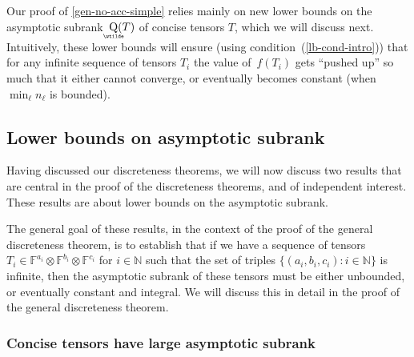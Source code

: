 \documentclass{daj}
\DeclareMathOperator{\asympsubrank}{\underaccent{\wtilde}{Q}}
\newcommand{\FF}{\mathbb{F}}
\newcommand{\NN}{\mathbb{N}}
\begin{document}
Our proof of \autoref{gen-no-acc-simple} relies mainly on new lower bounds on the asymptotic subrank~$\asympsubrank(T)$ of concise tensors $T$, which we will discuss next. Intuitively, these lower bounds will ensure (using condition~(\ref{lb-cond-intro})) that for any infinite sequence of tensors $T_i$ the value of~$f(T_i)$ gets ``pushed up'' so much that it either cannot converge, or eventually becomes constant (when $\min_\ell n_\ell$ is bounded).

%
%
%
%
%
%
%
%
%
%
%
%

\subsection{Lower bounds on asymptotic subrank}

Having discussed our discreteness theorems, we will now discuss two results that are central in the proof of the discreteness theorems, and of independent interest. These results are about lower bounds on the asymptotic subrank. 

The general goal of these results, in the context of the proof of the general discreteness theorem, is to establish that if we have a sequence of tensors $T_i \in \FF^{a_i} \otimes \FF^{b_i} \otimes \FF^{c_i}$ for $i \in \NN$ such that the set of triples $\{(a_i, b_i, c_i) : i \in \NN\}$ is infinite, then the asymptotic subrank of these tensors must be either unbounded, or eventually constant and integral. We will discuss this in detail in the proof of the general discreteness theorem.



\subsubsection{Concise tensors have large asymptotic subrank}
\end{document}
